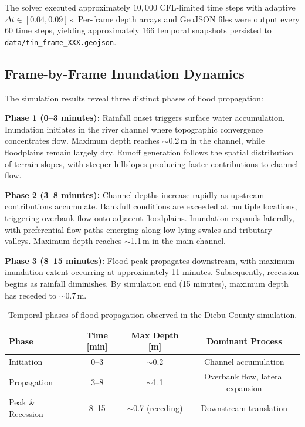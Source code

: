 \documentclass[11pt, a4paper]{article}
\begin{document}
\noindent The solver executed approximately $10{,}000$ CFL-limited time steps with adaptive $\Delta t \in [0.04, 0.09]$\,s. Per-frame depth arrays and GeoJSON files were output every 60 time steps, yielding approximately 166 temporal snapshots persisted to \texttt{data/tin\_frame\_XXX.geojson}.

\subsection{Frame-by-Frame Inundation Dynamics}

The simulation results reveal three distinct phases of flood propagation:

\textbf{Phase 1 (0--3 minutes):} Rainfall onset triggers surface water accumulation. Inundation initiates in the river channel where topographic convergence concentrates flow. Maximum depth reaches $\sim$0.2\,m in the channel, while floodplains remain largely dry. Runoff generation follows the spatial distribution of terrain slopes, with steeper hillslopes producing faster contributions to channel flow.

\textbf{Phase 2 (3--8 minutes):} Channel depths increase rapidly as upstream contributions accumulate. Bankfull conditions are exceeded at multiple locations, triggering overbank flow onto adjacent floodplains. Inundation expands laterally, with preferential flow paths emerging along low-lying swales and tributary valleys. Maximum depth reaches $\sim$1.1\,m in the main channel.

\textbf{Phase 3 (8--15 minutes):} Flood peak propagates downstream, with maximum inundation extent occurring at approximately 11 minutes. Subsequently, recession begins as rainfall diminishes. By simulation end (15 minutes), maximum depth has receded to $\sim$0.7\,m.

\begin{table}[htbp]
\centering
\caption{Temporal phases of flood propagation observed in the Diebu County simulation.}
\label{tab:phases}
\small
\begin{tabular}{@{}lccc@{}}
\toprule
\textbf{Phase} & \textbf{Time [min]} & \textbf{Max Depth [m]} & \textbf{Dominant Process} \\
\midrule
Initiation & 0--3 & $\sim$0.2 & Channel accumulation \\
Propagation & 3--8 & $\sim$1.1 & Overbank flow, lateral expansion \\
Peak \& Recession & 8--15 & $\sim$0.7 (receding) & Downstream translation \\
\bottomrule
\end{tabular}
\end{table}
\end{document}

